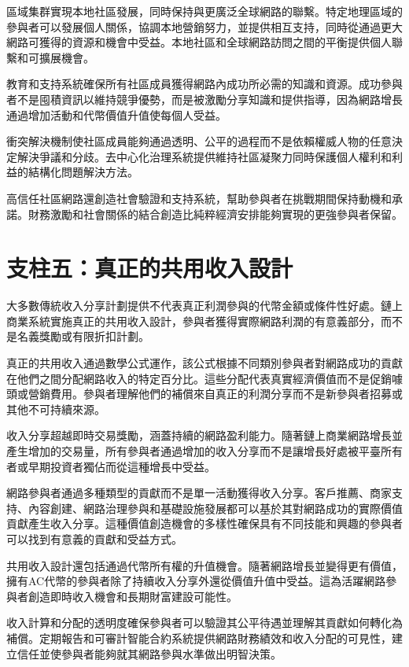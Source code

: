 \documentclass[
  Letterpaper,
]{scrbook}
\begin{document}
區域集群實現本地社區發展，同時保持與更廣泛全球網路的聯繫。特定地理區域的參與者可以發展個人關係，協調本地營銷努力，並提供相互支持，同時從通過更大網路可獲得的資源和機會中受益。本地社區和全球網路訪問之間的平衡提供個人聯繫和可擴展機會。

教育和支持系統確保所有社區成員獲得網路內成功所必需的知識和資源。成功參與者不是囤積資訊以維持競爭優勢，而是被激勵分享知識和提供指導，因為網路增長通過增加活動和代幣價值升值使每個人受益。

衝突解決機制使社區成員能夠通過透明、公平的過程而不是依賴權威人物的任意決定解決爭議和分歧。去中心化治理系統提供維持社區凝聚力同時保護個人權利和利益的結構化問題解決方法。

高信任社區網路還創造社會驗證和支持系統，幫助參與者在挑戰期間保持動機和承諾。財務激勵和社會關係的結合創造比純粹經濟安排能夠實現的更強參與者保留。

\section{支柱五：真正的共用收入設計}\label{ux652fux67f1ux4e94ux771fux6b63ux7684ux5171ux7528ux6536ux5165ux8a2dux8a08}

大多數傳統收入分享計劃提供不代表真正利潤參與的代幣金額或條件性好處。鏈上商業系統實施真正的共用收入設計，參與者獲得實際網路利潤的有意義部分，而不是名義獎勵或有限折扣計劃。

真正的共用收入通過數學公式運作，該公式根據不同類別參與者對網路成功的貢獻在他們之間分配網路收入的特定百分比。這些分配代表真實經濟價值而不是促銷噱頭或營銷費用。參與者理解他們的補償來自真正的利潤分享而不是新參與者招募或其他不可持續來源。

收入分享超越即時交易獎勵，涵蓋持續的網路盈利能力。隨著鏈上商業網路增長並產生增加的交易量，所有參與者通過增加的收入分享而不是讓增長好處被平臺所有者或早期投資者獨佔而從這種增長中受益。

網路參與者通過多種類型的貢獻而不是單一活動獲得收入分享。客戶推薦、商家支持、內容創建、網路治理參與和基礎設施發展都可以基於其對網路成功的實際價值貢獻產生收入分享。這種價值創造機會的多樣性確保具有不同技能和興趣的參與者可以找到有意義的貢獻和受益方式。

共用收入設計還包括通過代幣所有權的升值機會。隨著網路增長並變得更有價值，擁有AC代幣的參與者除了持續收入分享外還從價值升值中受益。這為活躍網路參與者創造即時收入機會和長期財富建設可能性。

收入計算和分配的透明度確保參與者可以驗證其公平待遇並理解其貢獻如何轉化為補償。定期報告和可審計智能合約系統提供網路財務績效和收入分配的可見性，建立信任並使參與者能夠就其網路參與水準做出明智決策。
\end{document}
